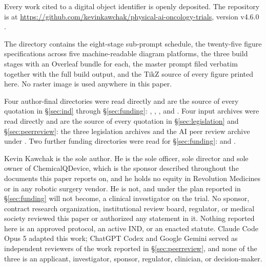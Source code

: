 
{\sloppy Every work cited to a digital object identifier is openly deposited.
The repository is at
\url{https://github.com/kevinkawchak/physical-ai-oncology-trials},
version v4.6.0 \cite{repo2026}.\par} The directory
 contains the eight-stage sub-prompt schedule, the
twenty-five figure specifications across five machine-readable diagram
platforms, the three build stages with an Overleaf bundle for each, the master
prompt filed verbatim together with the full build output, and the TikZ source
of every figure printed here. No raster image is used anywhere in this paper.

Four author-final directories were read directly and are the source of every
quotation in \S\ref{sec:ind} through \S\ref{sec:funding}:
,
,
, and
. Four input
archives were read directly and are the source of every quotation in \S\ref{sec:legislation} and
\S\ref{sec:peerreview}: the three legislation archives and the AI peer review archive under
. Two further funding directories were read for
\S\ref{sec:funding}:  and
.


Kevin Kawchak is the sole author. He is the sole officer, sole director and sole
owner of ChemicalQDevice, which is the sponsor described throughout the
documents this paper reports on, and he holds no equity in Revolution Medicines
or in any robotic surgery vendor. He is not, and under the plan reported in
\S\ref{sec:funding} will not become, a clinical investigator on the trial. No sponsor, contract
research organization, institutional review board, regulator, or medical society
reviewed this paper or authorized any statement in it. Nothing reported here is
an approved protocol, an active IND, or an enacted statute. Claude Code Opus 5
adapted this work; ChatGPT Codex and Google Gemini served as independent
reviewers of the work reported in \S\ref{sec:peerreview}, and none of the three is an applicant,
investigator, sponsor, regulator, clinician, or decision-maker.


